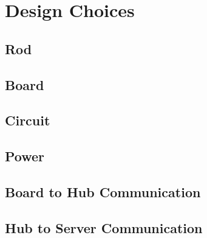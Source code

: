 \chapter{Design Choices}

\section{Rod}
    
\section{Board}
\section{Circuit}

\section{Power}
    

\section{Board to Hub Communication}
\section{Hub to Server Communication}
